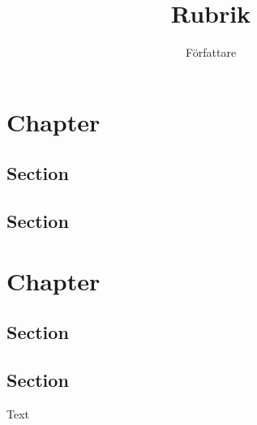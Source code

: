 \documentclass[a4paper, article]{memoir}
\title{Rubrik}
\author{Författare}
\begin{document}
\maketitle

\chapter{Chapter}
\section{Section}
\section{Section}

\chapter{Chapter}
\section{Section}
\section{Section}

Text
\end{document}
